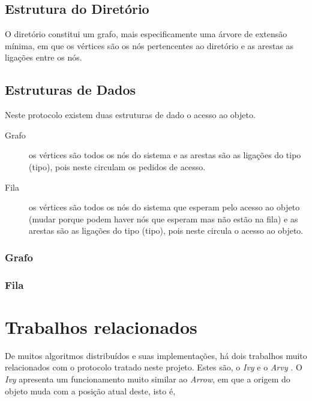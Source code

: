 \subsection{Estrutura do Diretório}


O diretório constitui um grafo, mais especificamente uma árvore de extensão mínima, em que os vértices são os nós pertencentes ao diretório e as arestas as ligações entre os nós.


\begin{comment}
     elementos
     - Nodes
    vértices do grafo
     

     - Ligações entre os nodes (ligação de finds e ligação do MyChan, ver ARVY)
     explicar porque é que as ligações viram
     - envios do obj são diretos
\end{comment}

\subsection{Estruturas de Dados}
Neste protocolo existem duas estruturas de dado o acesso ao objeto.

\begin{description}
    \item [Grafo] os vértices são todos os nós do sistema e as arestas são as ligações do tipo (tipo), pois neste circulam os pedidos de acesso.
    \item [Fila] os vértices são todos os nós do sistema que esperam pelo acesso ao objeto (mudar porque podem haver nós que esperam mas não estão na fila) e as arestas são as ligações do tipo (tipo), pois neste circula o acesso ao objeto.
\end{description}

\subsubsection*{Grafo}
\subsubsection*{Fila}


\section{Trabalhos relacionados}
De muitos algoritmos distribuídos e suas implementações, há dois trabalhos muito relacionados com o protocolo tratado neste projeto. Estes são, o \emph{Ivy} \cite{Ivy} e o \emph{Arvy} \cite{Arvy}.
O \emph{Ivy} apresenta um funcionamento muito similar ao \emph{Arrow}, em que a origem do objeto muda com a posição atual deste, isto é, 


